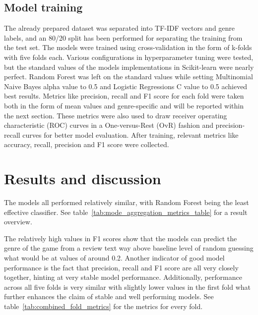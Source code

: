 \documentclass[11pt, a4paper]{article}
\begin{document}
\subsection{Model training}\label{subsec:model-training}
The already prepared dataset was separated into TF-IDF vectors and genre labels, and an 80/20 split has been performed
for separating the training from the test set.
The models were trained using cross-validation in the form of k-folds with five folds each.
Various configurations in hyperparameter tuning were tested, but the standard values of the models implementations in
Scikit-learn were nearly perfect.
Random Forest was left on the standard values while setting Multinomial Naive Bayes alpha value to 0.5 and Logistic
Regressions C value to 0.5 achieved best results.
Metrics like precision, recall and F1 score for each fold were taken both in the form of mean values and
genre-specific and will be reported within the next section.
These metrics were also used to draw receiver operating characteristic (ROC) curves in a One-versus-Rest (OvR) fashion
and precision-recall curves for better model evaluation.
After training, relevant metrics like accuracy, recall, precision and F1 score were collected.

\section{Results and discussion}\label{sec:results-and-discussion}
The models all performed relatively similar, with Random Forest being the least effective classifier.
See table~\ref{tab:mode_aggregation_metrics_table} for a result overview.



The relatively high values in F1 scores show that the models can predict the genre of the game from a review text way
above baseline level of random guessing what would be at values of around 0.2.
Another indicator of good model performance is the fact that precision, recall and F1 score are all very closely
together, hinting at very stable model performance.
Additionally, performance across all five folds is very similar with slightly lower values in the first fold
what further enhances the claim of stable and well performing models.
See table~\ref{tab:combined_fold_metrics} for the metrics for every fold.
\end{document}
